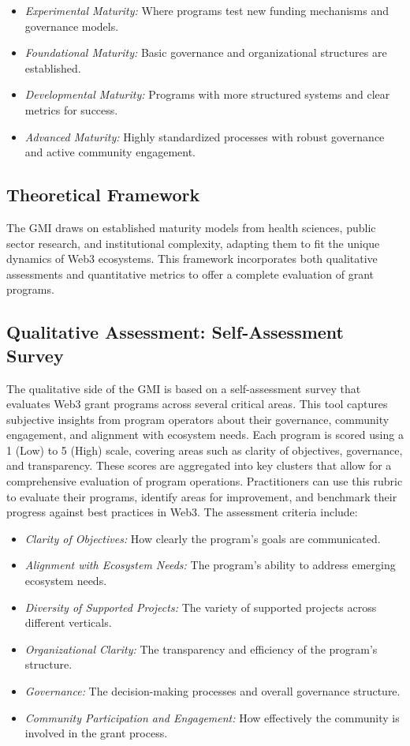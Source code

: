 \documentclass[a4,10pt]{article}
\begin{document}
\begin{itemize}
    \item \textit{Experimental Maturity:} Where programs test new funding mechanisms and governance models.
    \item \textit{Foundational Maturity:} Basic governance and organizational structures are established.
    \item \textit{Developmental Maturity:} Programs with more structured systems and clear metrics for success.
    \item \textit{Advanced Maturity:} Highly standardized processes with robust governance and active community engagement.
\end{itemize}

\subsection{Theoretical Framework}\label{sec_5.3}
The GMI draws on established maturity models from health sciences, public sector research, and institutional complexity, adapting them to fit the unique dynamics of Web3 ecosystems. This framework incorporates both qualitative assessments and quantitative metrics to offer a complete evaluation of grant programs.

\subsection{Qualitative Assessment: Self-Assessment Survey}\label{sec_5.4}
The qualitative side of the GMI is based on a self-assessment survey that evaluates Web3 grant programs across several critical areas. This tool captures subjective insights from program operators about their governance, community engagement, and alignment with ecosystem needs. Each program is scored using a 1 (Low) to 5 (High) scale, covering areas such as clarity of objectives, governance, and transparency. These scores are aggregated into key clusters that allow for a comprehensive evaluation of program operations. Practitioners can use this rubric to evaluate their programs, identify areas for improvement, and benchmark their progress against best practices in Web3. The assessment criteria include:

\begin{itemize}
    \item \textit{Clarity of Objectives:} How clearly the program’s goals are communicated.
    \item \textit{Alignment with Ecosystem Needs:} The program’s ability to address emerging ecosystem needs.
    \item \textit{Diversity of Supported Projects:} The variety of supported projects across different verticals.
    \item \textit{Organizational Clarity:} The transparency and efficiency of the program’s structure.
    \item \textit{Governance:} The decision-making processes and overall governance structure.
    \item \textit{Community Participation and Engagement:} How effectively the community is involved in the grant process.
\end{itemize}
\end{document}
